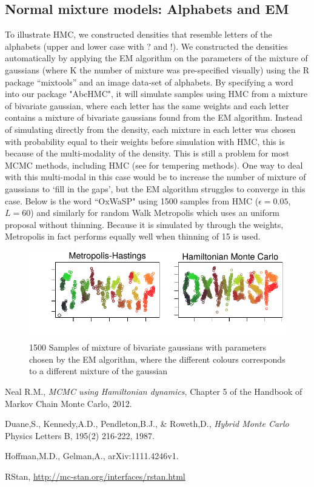 \documentclass[11pt]{article}
\begin{document}
\subsection{Normal mixture models: Alphabets and EM}
To illustrate HMC, we constructed densities that resemble letters of the alphabets (upper and lower case with ? and !). We constructed the densities automatically by applying the EM algorithm on the parameters of the mixture of gaussians (where K the number of mixture was pre-specified visually) using the R package ``mixtools'' and an image data-set of alphabets. By specifying a word into our package "AbcHMC", it will simulate samples using HMC from a mixture of bivariate gaussian, where each letter has the same weights and each letter contains a mixture of bivariate gaussians found from the EM algorithm. Instead of simulating directly from the density, each mixture in each letter was chosen with probability equal to their weights before simulation with HMC, this is because of the multi-modality of the density. This is still a problem for most MCMC methods, including HMC (see \cite{neal} for tempering methods). One way to deal with this multi-modal in this case would be to increase the number of mixture of gaussians to `fill in the gaps', but the EM algorithm struggles to converge in this case. Below is the word ``OxWaSP" using 1500 samples from HMC ($\epsilon=0.05$, $L=60$) and similarly for random Walk Metropolis which uses an uniform proposal without thinning. Because it is simulated by through the weights, Metropolis in fact performs equally well when thinning of 15 is used.
\begin{figure}[H]
\center
  \includegraphics[width=5in]{images/oxwasp.pdf}
  \caption{1500 Samples of mixture of bivariate gaussians with parameters chosen by the EM algorithm, where the different colours corresponds to a different mixture of the gaussian}
\end{figure}
\begin{thebibliography}{9}

  Neal R.M.,
  \emph{MCMC using Hamiltonian dynamics},
  Chapter 5 of the Handbook of Markov Chain Monte Carlo,
  2012.
  
  Duane,S., Kennedy,A.D., Pendleton,B.J., \& Roweth,D.,
  \emph{Hybrid Monte Carlo }
  Physics Letters B, 195(2) 216-222, 1987.

  Hoffman,M.D., Gelman,A.,
  arXiv:1111.4246v1.
  
  RStan, \url{http://mc-stan.org/interfaces/rstan.html}

\end{thebibliography}
\end{document}
